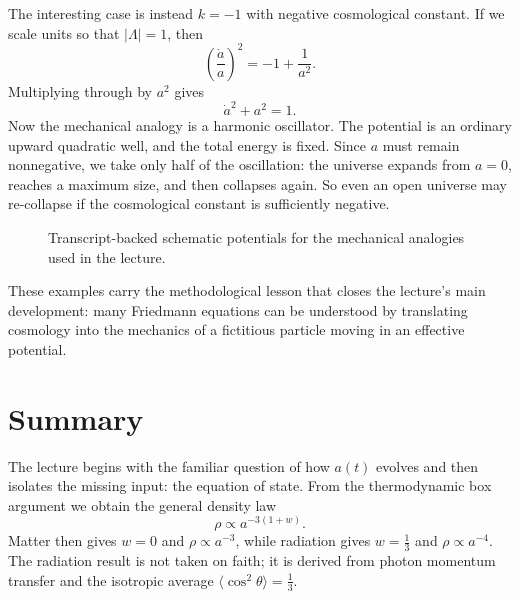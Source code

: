 The interesting case is instead \(k=-1\) with negative cosmological constant. If we scale units so that \(|\Lambda|=1\), then
\begin{equation}
\left(\frac{\dot a}{a}\right)^2=-1+\frac{1}{a^2}.
\end{equation}
Multiplying through by \(a^2\) gives
\begin{equation}
\dot a^2+a^2=1.
\end{equation}
Now the mechanical analogy is a harmonic oscillator. The potential is an ordinary upward quadratic well, and the total energy is fixed. Since \(a\) must remain nonnegative, we take only half of the oscillation: the universe expands from \(a=0\), reaches a maximum size, and then collapses again. So even an open universe may re-collapse if the cosmological constant is sufficiently negative.

\begin{figure}[h]
\centering
{}
\hspace{2em}
\caption{Transcript-backed schematic potentials for the mechanical analogies used in the lecture.}
\end{figure}

These examples carry the methodological lesson that closes the lecture's main development: many Friedmann equations can be understood by translating cosmology into the mechanics of a fictitious particle moving in an effective potential.

\section{Summary}

The lecture begins with the familiar question of how \(a(t)\) evolves and then isolates the missing input: the equation of state. From the thermodynamic box argument we obtain the general density law
\[
\rho\propto a^{-3(1+w)}.
\]
Matter then gives \(w=0\) and \(\rho\propto a^{-3}\), while radiation gives \(w=\tfrac13\) and \(\rho\propto a^{-4}\). The radiation result is not taken on faith; it is derived from photon momentum transfer and the isotropic average \(\langle \cos^2\theta\rangle=\tfrac13\).

